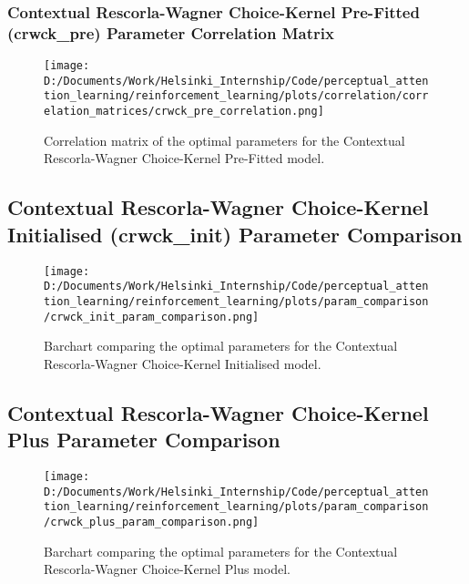 \documentclass[12pt]{article}
\newcommand{\correlation}{0.25}
\newcommand{\parameter}{0.35}
\begin{document}
\subsubsection{Contextual Rescorla-Wagner Choice-Kernel Pre-Fitted (crwck\_pre) Parameter Correlation Matrix}

\begin{figure}[h]  %
	\centering
	\texttt{[image: D:/Documents/Work/Helsinki\_Internship/Code/perceptual\_attention\_learning/reinforcement\_learning/plots/correlation/correlation\_matrices/crwck\_pre\_correlation.png]}  %
	\caption{Correlation matrix of the optimal parameters for the Contextual Rescorla-Wagner Choice-Kernel Pre-Fitted model.}
	\label{fig:crwck_pre_correlation_matrix}
\end{figure} 
\newpage

\subsection{Contextual Rescorla-Wagner Choice-Kernel Initialised (crwck\_init) Parameter Comparison}

\begin{figure}[h]  %
	\centering
	\texttt{[image: D:/Documents/Work/Helsinki\_Internship/Code/perceptual\_attention\_learning/reinforcement\_learning/plots/param\_comparison/crwck\_init\_param\_comparison.png]}  %
	\caption{Barchart comparing the optimal parameters for the Contextual Rescorla-Wagner Choice-Kernel Initialised model.}
	\label{fig:crwck_init_model_parmeters}
\end{figure}
\newpage

\subsection{Contextual Rescorla-Wagner Choice-Kernel Plus Parameter Comparison}

\begin{figure}[h]  %
	\centering
	\texttt{[image: D:/Documents/Work/Helsinki\_Internship/Code/perceptual\_attention\_learning/reinforcement\_learning/plots/param\_comparison/crwck\_plus\_param\_comparison.png]}  %
	\caption{Barchart comparing the optimal parameters for the Contextual Rescorla-Wagner Choice-Kernel Plus model.}
	\label{fig:crwck_plus_model_parmeters}
\end{figure} 
\end{document}
